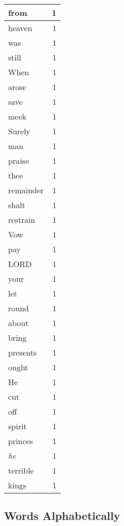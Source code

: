 \begin{center}
\begin{longtable}{l|r}
from & 1 \\ \hline
heaven & 1 \\ \hline
was & 1 \\ \hline
still & 1 \\ \hline
When & 1 \\ \hline
arose & 1 \\ \hline
save & 1 \\ \hline
meek & 1 \\ \hline
Surely & 1 \\ \hline
man & 1 \\ \hline
praise & 1 \\ \hline
thee & 1 \\ \hline
remainder & 1 \\ \hline
shalt & 1 \\ \hline
restrain & 1 \\ \hline
Vow & 1 \\ \hline
pay & 1 \\ \hline
LORD & 1 \\ \hline
your & 1 \\ \hline
let & 1 \\ \hline
round & 1 \\ \hline
about & 1 \\ \hline
bring & 1 \\ \hline
presents & 1 \\ \hline
ought & 1 \\ \hline
He & 1 \\ \hline
cut & 1 \\ \hline
off & 1 \\ \hline
spirit & 1 \\ \hline
princes & 1 \\ \hline
\emph{he} & 1 \\ \hline
terrible & 1 \\ \hline
kings & 1 \\ \hline
\end{longtable}
\end{center}



\normalsize



\subsection{Words Alphabetically}

